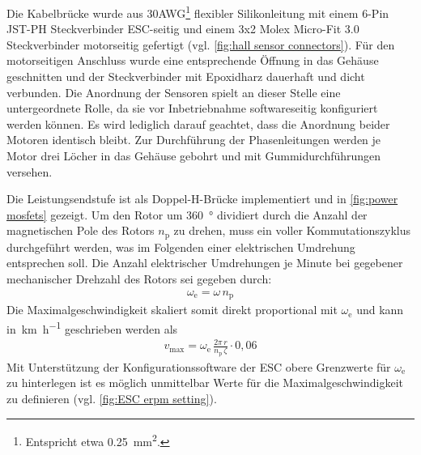 	Die Kabelbrücke wurde aus 30AWG\footnote{Entspricht etwa \qty{0,25}{\milli\metre\squared}.} flexibler Silikonleitung mit einem 6-Pin JST-PH Steckverbinder ESC-seitig und einem 3x2 Molex Micro-Fit 3.0 Steckverbinder motorseitig gefertigt (vgl. \cref{fig:hall sensor connectors}).
	Für den motorseitigen Anschluss wurde eine entsprechende Öffnung in das Gehäuse geschnitten und der Steckverbinder mit Epoxidharz dauerhaft und dicht verbunden.
	Die Anordnung der Sensoren spielt an dieser Stelle eine untergeordnete Rolle, da sie vor Inbetriebnahme softwareseitig konfiguriert werden können.
	Es wird lediglich darauf geachtet, dass die Anordnung beider Motoren identisch bleibt.
	Zur Durchführung der Phasenleitungen werden je Motor drei Löcher in das Gehäuse gebohrt und mit Gummidurchführungen versehen.\par\medskip
	Die Leistungsendstufe ist als Doppel-H-Brücke implementiert und in \cref{fig:power mosfets} gezeigt.
	Um den Rotor um \qty{360}{\degree} dividiert durch die Anzahl der magnetischen Pole des Rotors \(n_\text{p}\) zu drehen, muss ein voller Kommutationszyklus durchgeführt werden, was im Folgenden einer elektrischen Umdrehung entsprechen soll.
	Die Anzahl elektrischer Umdrehungen je Minute bei gegebener mechanischer Drehzahl des Rotors sei gegeben durch:
	\begin{align}
		\omega_\text{e} = \omega \, n_\text{p}
		\label{eq:ERPM and RPM}
	\end{align}
	Die Maximalgeschwindigkeit skaliert somit direkt proportional mit \(\omega_\text{e}\) und kann in~\unit{\kilo\metre\per\hour} geschrieben werden als
	\begin{align}
		v_\text{max} = \omega_\text{e} \, \frac{2\pi \, r}{n_\text{p} \, \zeta} \cdot 0,06
		\label{eq:max speed by ERPM}
	\end{align}
	Mit Unterstützung der Konfigurationssoftware der ESC obere Grenzwerte für \(\omega_\text{e}\) zu hinterlegen ist es möglich unmittelbar Werte für die Maximalgeschwindigkeit zu definieren (vgl. \cref{fig:ESC erpm setting}).